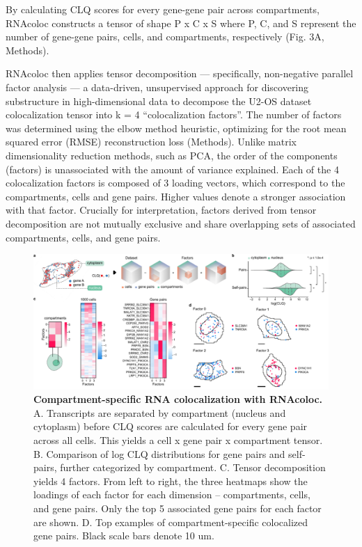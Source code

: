 By calculating CLQ scores for every gene-gene pair across compartments, RNAcoloc constructs a tensor of shape P x C x S where P, C, and S represent the number of gene-gene pairs, cells, and compartments, respectively (Fig. 3A, Methods). 

RNAcoloc then applies tensor decomposition — specifically, non-negative parallel factor analysis — a data-driven, unsupervised approach for discovering substructure in high-dimensional data\cite{kossaifiTensorLyTensorLearning2019,shashuaNonnegativeTensorFactorization2005} to decompose the U2-OS dataset colocalization tensor into k = 4 ``colocalization factors''. The number of factors was determined using the elbow method heuristic, optimizing for the root mean squared error (RMSE) reconstruction loss (Methods). Unlike matrix dimensionality reduction methods, such as PCA, the order of the components (factors) is unassociated with the amount of variance explained. Each of the 4 colocalization factors is composed of 3 loading vectors, which correspond to the compartments, cells and gene pairs. Higher values denote a stronger association with that factor. Crucially for interpretation, factors derived from tensor decomposition are not mutually exclusive and share overlapping sets of associated compartments, cells, and gene pairs.

\begin{figure}[p]
    \centering
    \includegraphics[width=\textwidth]{1_figures-and-files/Fig3.pdf}
    \caption[Compartment-specific RNA colocalization with RNAcoloc.]{\textbf{Compartment-specific RNA colocalization with RNAcoloc.} A. Transcripts are separated by compartment (nucleus and cytoplasm) before CLQ scores are calculated for every gene pair across all cells. This yields a cell x gene pair x compartment tensor. B. Comparison of log CLQ distributions for gene pairs and self-pairs, further categorized by compartment. C. Tensor decomposition yields 4 factors. From left to right, the three heatmaps show the loadings of each factor for each dimension – compartments, cells, and gene pairs. Only the top 5 associated gene pairs for each factor are shown. D. Top examples of compartment-specific colocalized gene pairs. Black scale bars denote 10 um.
    }
    \label{fig:3 RNAcoloc colocalization analysis}
\end{figure}

